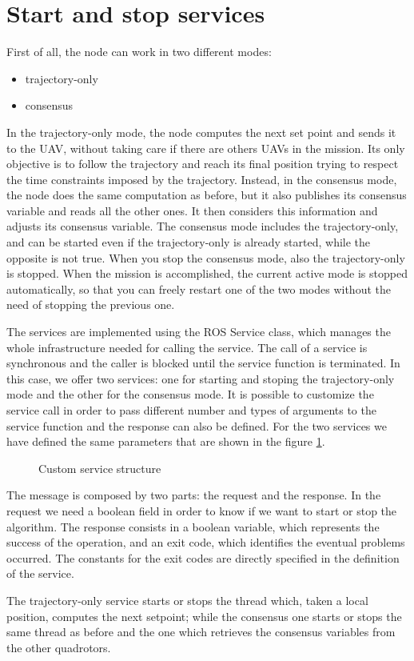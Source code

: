 \section{Start and stop services\label{sec:start_stop_services}}

First of all, the node can work in two different modes:
\begin{itemize}
  \item trajectory-only
  \item consensus
\end{itemize}

In the trajectory-only mode, the node computes the next set point and sends it to
the UAV, without taking care if there are others UAVs in the mission. Its only objective
is to follow the trajectory and reach its final position trying to respect the time
constraints imposed by the trajectory.
Instead, in the consensus mode, the node does the same computation as before, but
it also publishes its consensus variable and reads all the other ones.
It then considers this information and adjusts its consensus variable.
The consensus mode includes the trajectory-only, and can be started even if the
trajectory-only is already started, while the opposite is not true. When you stop
the consensus mode, also the trajectory-only is stopped.
When the mission is accomplished, the current active mode is stopped automatically,
so that you can freely restart one of the two modes without the need of stopping
the previous one.

The services are implemented using the ROS Service class, which manages the whole
infrastructure needed for calling the service. The call of a service is
synchronous and the caller is blocked until the service function is terminated.
In this case, we offer two services: one for starting and stoping the trajectory-only
mode and the other for the consensus mode.
It is possible to customize the service call in order to pass different number
and types of arguments to the service function and the response can also be
defined.
For the two services we have defined the same parameters that are shown in the figure
\ref{fig:custom_service}.

\begin{figure}[ht]
\centering
  
\caption{Custom service structure}
\label{fig:custom_service}
\end{figure}

The message is composed by two parts: the request and the response.
In the request we need a boolean field in order to know if
we want to start or stop the algorithm. The response consists in a boolean variable,
which represents the success of the operation, and an exit code, which identifies
the eventual problems occurred. The constants for the exit codes are directly specified
in the definition of the service.

The trajectory-only service starts or stops the thread which, taken a local position,
computes the next setpoint; while the consensus one starts or stops the same
thread as before and the one which retrieves the consensus variables from the other
quadrotors.
